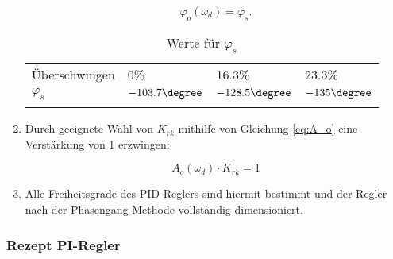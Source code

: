 \begin{enumerate}
        \begin{equation} \label{eq:phi_o}
            \varphi_o(\omega_d)=\varphi_s.
        \end{equation}

        \begin{longtable}{llll}
            \toprule
            \endhead
            \endfoot
            \endlastfoot


            \"Uberschwingen & 0\%              & 16.3\%           & 23.3\% \\
            $\varphi_s$        & $-103.7 \degree$ & $-128.5 \degree$ & $-135 \degree$ \\

            \bottomrule
            \caption{Werte f\"ur $\varphi_s$}
            \label{tab:phi_s}
        \end{longtable}

    \item
        Durch geeignete Wahl von  $K_{rk}$ mithilfe von Gleichung \ref{eq:A_o}
        eine Verst\"arkung von 1 erzwingen:

        \begin{equation} \label{eq:A_o}
            A_o(\omega_d) \cdot K_{rk} = 1
        \end{equation}

    \item
        Alle  Freiheitsgrade des  PID-Reglers  sind hiermit  bestimmt und  der
        Regler nach der Phasengang-Methode vollst\"andig dimensioniert.
\end{enumerate}



\subsubsection{Rezept PI-Regler}


